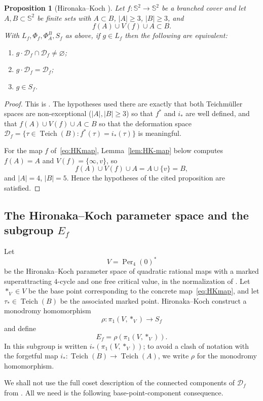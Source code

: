 \documentclass[12pt]{article}
\newtheorem{proposition}[theorem]{Proposition}
\theoremstyle{definition}
\theoremstyle{remark}
\numberwithin{equation}{section}
\newcommand{\Sph}{\mathbb S}
\newcommand{\Teich}{\operatorname{Teich}}
\newcommand{\Df}{\mathcal D_f}
\newcommand{\Lf}{L_f}
\newcommand{\Sf}{S_f}
\newcommand{\Ef}{E_f}
\newcommand{\Per}{\operatorname{Per}}
\newcommand{\HF}{\Phi_f}
\newcommand{\FAB}{\Phi_A^B}
\begin{document}
\begin{proposition}[Hironaka--Koch {\cite[Proposition~2.1]{HK}}]
\label{prop:HK21}
Let $f:\Sph^{2}\to\Sph^{2}$ be a branched cover and let
$A,B\subset\Sph^{2}$ be finite sets with $A\subset B$, $|A|\ge3$,
$|B|\ge3$, and
\[
f(A)\cup V(f)\cup A\subset B.
\]
With $\Lf,\HF,\FAB,\Sf$ as above, if $g\in\Lf$ then the following are
equivalent:
\begin{enumerate}[label=(\roman*)]
\item\label{it:stab-nonempty} $g\cdot\Df\cap\Df\neq\varnothing$;
\item\label{it:stab-eq} $g\cdot\Df=\Df$;
\item\label{it:stab-Sf} $g\in\Sf$.
\end{enumerate}
\end{proposition}
\begin{proof}
This is \cite[Proposition~2.1]{HK}.  The hypotheses used there are
exactly that both Teichm\"uller spaces are non-exceptional
($|A|,|B|\ge3$) so that $f^{*}$ and $i_{*}$ are well defined, and that
$f(A)\cup V(f)\cup A\subset B$ so that the deformation space
$\Df=\{\tau\in\Teich(B):f^{*}(\tau)=i_{*}(\tau)\}$ is meaningful.

For the map $f$ of~\eqref{eq:HKmap}, Lemma~\ref{lem:HK-map} below
computes $f(A)=A$ and $V(f)=\{\infty,v\}$, so
\[
f(A)\cup V(f)\cup A=A\cup\{v\}=B,
\]
and $|A|=4$, $|B|=5$.  Hence the hypotheses of the cited proposition
are satisfied.
\end{proof}

\subsection{The Hironaka--Koch parameter space and the subgroup $\Ef$}

Let
\[
V=\Per_{4}(0)^{*}
\]
be the Hironaka--Koch parameter space of quadratic rational maps with a
marked superattracting $4$-cycle and one free critical value, in the
normalization of \cite[\S4]{HK}.  Let $*_{V}\in V$ be the base point
corresponding to the concrete map~\eqref{eq:HKmap}, and let
$\tau_{*}\in\Teich(B)$ be the associated marked point.  Hironaka--Koch
construct a monodromy homomorphism
\[
\rho:\pi_{1}(V,*_{V})\longrightarrow\Sf
\]
and define
\[
\Ef=\rho(\pi_{1}(V,*_{V})).
\]
In \cite{HK} this subgroup is written $i_{*}(\pi_{1}(V,*_{V}))$; to
avoid a clash of notation with the forgetful map
$i_{*}:\Teich(B)\to\Teich(A)$, we write $\rho$ for the monodromy
homomorphism.

We shall not use the full coset description of the connected components
of $\Df$ from \cite[Proposition~3.4]{HK}.  All we need is the following
base-point-component consequence.
\end{document}
